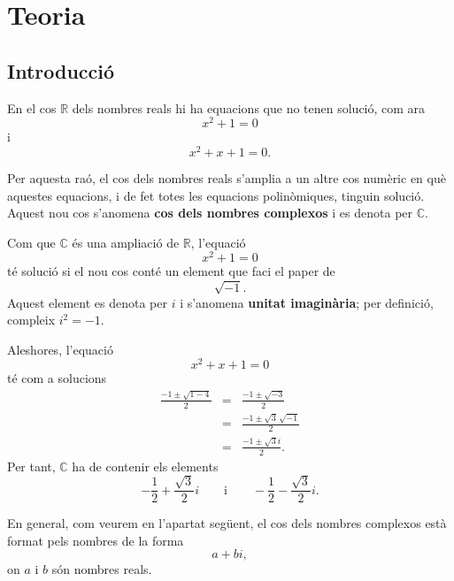 \chapter{Teoria}
\label{cap:teoria}
\section{Introducció}

En el cos $\mathbb{R}$ dels nombres reals hi ha equacions que no tenen solució, com ara
\begin{equation*}
x^{2}+1=0
\end{equation*}
i
\begin{equation*}
x^{2}+x+1=0.
\end{equation*}

Per aquesta raó, el cos dels nombres reals s'amplia a un altre cos numèric en què aquestes equacions, i de fet totes les equacions polinòmiques, tinguin solució. Aquest nou cos s'anomena \textbf{cos dels nombres complexos} i es denota per $\mathbb{C}$.

Com que $\mathbb{C}$ és una ampliació de $\mathbb{R}$, l'equació
\begin{equation*}
x^{2}+1=0
\end{equation*}
té solució si el nou cos conté un element que faci el paper de
\begin{equation*}
\sqrt{-1}.
\end{equation*}
Aquest element es denota per $i$ i s'anomena \textbf{unitat imaginària}; per definició, compleix $i^2=-1$.

Aleshores, l'equació
\begin{equation*}
x^{2}+x+1=0
\end{equation*}
té com a solucions
\begin{eqnarray*}
\frac{-1\pm \sqrt{1-4}}{2} &=&\frac{-1\pm \sqrt{-3}}{2} \\
&=&\frac{-1\pm \sqrt{3}\,\sqrt{-1}}{2} \\
&=&\frac{-1\pm \sqrt{3}i}{2}.
\end{eqnarray*}
Per tant, $\mathbb{C}$ ha de contenir els elements
\begin{equation*}
-\frac{1}{2}+\frac{\sqrt{3}}{2}i \qquad \text{i} \qquad -\frac{1}{2}-\frac{\sqrt{3}}{2}i.
\end{equation*}

En general, com veurem en l'apartat següent, el cos dels nombres complexos està format pels nombres de la forma
\begin{equation*}
a+bi,
\end{equation*}
on $a$ i $b$ són nombres reals.

